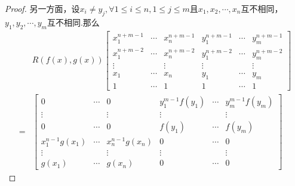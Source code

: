 {\begin{proof}
        另一方面，设$x_i\neq y_j,\forall 1\leqslant i\leqslant n,1\leqslant j\leqslant m$且$x_1,x_2,\cdots,x_n$互不相同，$y_1,y_2,\cdots,y_m$互不相同.那么
        \begin{align*}
              & R\left(f\left(x\right),g\left(x\right)\right)\begin{bmatrix}
                                                                 x_1^{n+m-1} & \cdots & x_n^{n+m-1} & y_1^{n+m-1} & \cdots & y_m^{n+m-1} \\
                                                                 x_1^{n+m-2} & \cdots & x_n^{n+m-2} & y_1^{n+m-2} & \cdots & y_m^{n+m-2} \\
                                                                 \vdots      &        & \vdots      & \vdots      &        & \vdots      \\
                                                                 x_1         & \cdots & x_n         & y_1         & \cdots & y_m         \\
                                                                 1           & \cdots & 1           & 1           & \cdots & 1
                                                             \end{bmatrix} \\
            = &
            \begin{bmatrix}
                0                          & \cdots & 0                          & y_1^{m-1}f\left(y_1\right) & \cdots & y_m^{m-1}f\left(y_m\right) \\
                \vdots                     &        & \vdots                     & \vdots                     &        & \vdots                     \\
                0                          & \cdots & 0                          & f\left(y_1\right)          & \cdots & f\left(y_m\right)          \\
                x_1^{n-1}g\left(x_1\right) & \cdots & x_n^{n-1}g\left(x_n\right) & 0                          & \cdots & 0                          \\
                \vdots                     &        & \vdots                     & \vdots                     &        & \vdots                     \\
                g\left(x_1\right)          & \cdots & g\left(x_n\right)          & 0                          & \cdots & 0
            \end{bmatrix}
        \end{align*}

\end{proof}}
